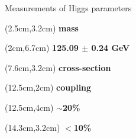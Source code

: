 \begin{frame}{Measurements of Higgs parameters}

\begin{textblock*}{5cm}(2.5cm,3.2cm) %
   \textcolor{HHturquoise_d}{\textbf{mass}}
\end{textblock*}
\begin{textblock*}{5cm}(2cm,6.7cm) %
   \textcolor{HHred}{\small\textbf{125.09 $\pm$ 0.24 GeV}}
\end{textblock*}

\begin{textblock*}{5cm}(7.6cm,3.2cm) %
   \textcolor{HHturquoise_d}{\textbf{cross-section}}
\end{textblock*}
\begin{textblock*}{5cm}(12.5cm,2cm) %
   \textcolor{HHturquoise_d}{\textbf{coupling}}
\end{textblock*}

\begin{textblock*}{5cm}(12.5cm,4cm) %
   \small\textbf{$\sim$20\%}
\end{textblock*}

\begin{textblock*}{5cm}(14.3cm,3.2cm) %
   \small\textbf{$<$10\%}
\end{textblock*}


\begin{figure}
    \centering
\end{figure}


\end{frame}
